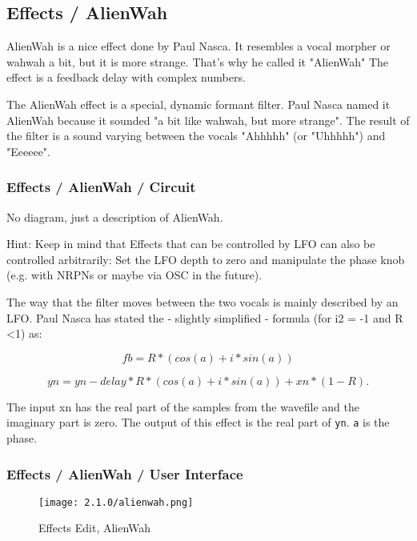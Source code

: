 
\subsection{Effects / AlienWah}
\label{subsec:effects_edit_alienwah}

   AlienWah is a nice effect done by Paul Nasca. It resembles a vocal morpher
   or wahwah a bit, but it is more strange. That's why he called it "AlienWah"
   The effect is a feedback delay with complex numbers.

   The AlienWah effect is a special, dynamic formant filter.
   Paul Nasca named it AlienWah because it sounded "a bit like
   wahwah, but more strange". The result of the filter is a sound varying
   between the vocals "Ahhhhh" (or "Uhhhhh") and "Eeeeee".

\subsubsection{Effects / AlienWah / Circuit}
\label{subsubsec:effects_edit_alienwah_circuit}

   No diagram, just a description of AlienWah.

   Hint: Keep in mind that Effects that can be controlled by LFO can also be
   controlled arbitrarily: Set the LFO depth to zero and manipulate the phase
   knob (e.g. with NRPNs or maybe via OSC in the future).

   The way that the filter moves between the two vocals is mainly described
   by an LFO. Paul Nasca has stated the - slightly simplified - formula (for
   i2 = -1 and R \textless 1) as:

   \[fb=R*(cos(a)+i*sin(a))\]

   \[yn=yn-delay*R*(cos(a)+i*sin(a))+xn*(1-R).\]

   The input xn has the real part of the samples from the wavefile and the
   imaginary part is zero. The output of this effect is the real part of
   \texttt{yn}.
   \texttt{a} is the phase.

\subsubsection{Effects / AlienWah / User Interface}
\label{subsubsec:effects_edit_alienwah_ui}

\begin{figure}[H]
   \centering
   \texttt{[image: 2.1.0/alienwah.png]}
   \caption{Effects Edit, AlienWah}
   \label{fig:effects_edit_alienwah}
\end{figure}

